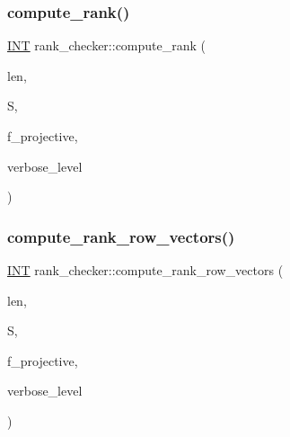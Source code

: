 \mbox{\label{classrank__checker_ac627a6357e987db80fc5325481b747e2}} 
\subsubsection{\texorpdfstring{compute\+\_\+rank()}{compute\_rank()}}
{\footnotesize\ttfamily \mbox{\hyperlink{galois_8h_a09fddde158a3a20bd2dcadb609de11dc}{I\+NT}} rank\+\_\+checker\+::compute\+\_\+rank (\begin{DoxyParamCaption}\item[{\mbox{\hyperlink{galois_8h_a09fddde158a3a20bd2dcadb609de11dc}{I\+NT}}}]{len,  }\item[{\mbox{\hyperlink{galois_8h_a09fddde158a3a20bd2dcadb609de11dc}{I\+NT}} $\ast$}]{S,  }\item[{\mbox{\hyperlink{galois_8h_a09fddde158a3a20bd2dcadb609de11dc}{I\+NT}}}]{f\+\_\+projective,  }\item[{\mbox{\hyperlink{galois_8h_a09fddde158a3a20bd2dcadb609de11dc}{I\+NT}}}]{verbose\+\_\+level }\end{DoxyParamCaption})}

\mbox{\label{classrank__checker_a3f95a435c05d3762563ff0009c7a648c}} 
\subsubsection{\texorpdfstring{compute\+\_\+rank\+\_\+row\+\_\+vectors()}{compute\_rank\_row\_vectors()}}
{\footnotesize\ttfamily \mbox{\hyperlink{galois_8h_a09fddde158a3a20bd2dcadb609de11dc}{I\+NT}} rank\+\_\+checker\+::compute\+\_\+rank\+\_\+row\+\_\+vectors (\begin{DoxyParamCaption}\item[{\mbox{\hyperlink{galois_8h_a09fddde158a3a20bd2dcadb609de11dc}{I\+NT}}}]{len,  }\item[{\mbox{\hyperlink{galois_8h_a09fddde158a3a20bd2dcadb609de11dc}{I\+NT}} $\ast$}]{S,  }\item[{\mbox{\hyperlink{galois_8h_a09fddde158a3a20bd2dcadb609de11dc}{I\+NT}}}]{f\+\_\+projective,  }\item[{\mbox{\hyperlink{galois_8h_a09fddde158a3a20bd2dcadb609de11dc}{I\+NT}}}]{verbose\+\_\+level }\end{DoxyParamCaption})}

